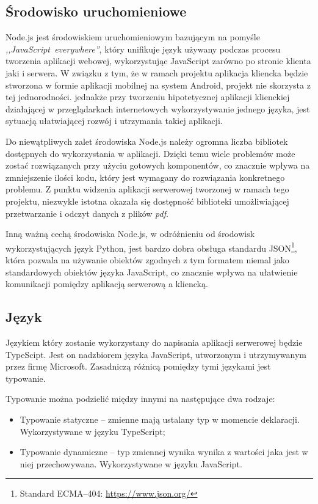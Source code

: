\documentclass[a4paper,12pt,twoside,openany]{report}
\begin{document}
\subsection{Środowisko uruchomieniowe}
Node.js jest środowiskiem uruchomieniowym bazującym na pomyśle \textit{,,JavaScript~everywhere''}, który unifikuje język używany podczas procesu tworzenia aplikacji webowej, wykorzystując JavaScript zarówno po stronie klienta jaki i serwera. W związku z tym, że w ramach projektu aplikacja kliencka będzie stworzona w formie aplikacji mobilnej na system Android, projekt nie skorzysta z tej jednorodności. jednakże przy tworzeniu hipotetycznej aplikacji klienckiej działającej w przeglądarkach internetowych wykorzystywanie jednego języka, jest  sytuacją ułatwiającej rozwój i utrzymania takiej aplikacji.

Do niewątpliwych zalet środowiska Node.js należy ogromna liczba bibliotek dostępnych do wykorzystania w aplikacji. Dzięki temu wiele problemów może zostać rozwiązanych przy użyciu gotowych komponentów, co znacznie wpływa na zmniejszenie ilości kodu, który jest wymagany do rozwiązania konkretnego problemu. Z punktu widzenia aplikacji serwerowej tworzonej w ramach tego projektu, niezwykle istotna okazała się dostępność biblioteki umożliwiającej przetwarzanie i odczyt danych z plików \textit{pdf}. 

Inną ważną cechą środowiska Node.js, w odróżnieniu od środowisk wykorzystujących  język Python, jest bardzo dobra obsługa standardu JSON\footnote{Standard ECMA--404: \url{https://www.json.org/}}, która pozwala na używanie obiektów zgodnych z tym formatem niemal jako standardowych obiektów języka JavaScript, co znacznie wpływa na ułatwienie komunikacji pomiędzy aplikacją serwerową a kliencką. 

\subsection{Język}
Językiem który zostanie wykorzystany do napisania aplikacji serwerowej będzie TypeScipt. Jest on nadzbiorem języka JavaScript, utworzonym i utrzymywanym przez firmę Microsoft. Zasadniczą różnicą pomiędzy tymi językami jest typowanie.

Typowanie można podzielić między innymi na następujące dwa rodzaje:
\begin{itemize}
	\item Typowanie statyczne -- zmienne mają ustalany typ w momencie deklaracji. Wykorzystywane w języku TypeScript;
	\item Typowanie dynamiczne --  typ zmiennej wynika wynika z wartości jaka jest w niej przechowywana. Wykorzystywane w języku JavaScript.
\end{itemize}
\end{document}
